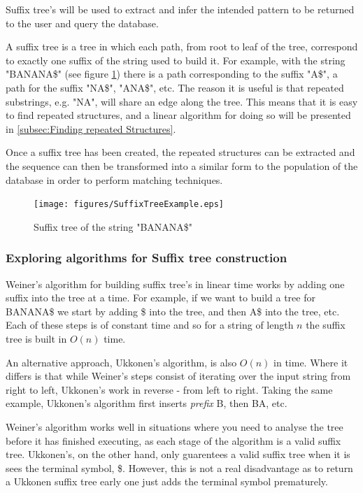 \documentclass[12pt,twoside,notitlepage]{report}
\begin{document}
		Suffix tree's will be used to extract and infer the intended pattern to be returned to the user and query the database.
		
		A suffix tree\cite{Weiner1973} is a tree in which each path, from root to leaf of the tree, correspond to exactly one suffix of the string used to build it. For example, with the string "BANANA\$" (see figure \ref{SuffixTree}) there is a path corresponding to the suffix "A\$", a path for the suffix "NA\$", "ANA\$", etc. The reason it is useful is that repeated substrings, e.g. "NA", will share an edge along the tree. This means that it is easy to find repeated structures, and a linear algorithm\cite{Ukonnen1995} for doing so will be presented in \ref{subsec:Finding repeated Structures}.	
		
		Once a suffix tree has been created, the repeated structures can be extracted and the sequence can then be transformed into a similar form to the population of the database in order to perform matching techniques.
\begin{figure}[h]
			\centerline{\texttt{[image: figures/SuffixTreeExample.eps]}}
			\caption{\label{SuffixTree} Suffix tree of the string "BANANA\$"}
\end{figure}
		
			\subsubsection{Exploring algorithms for Suffix tree construction}
			Weiner's algorithm\cite{Weiner1973} for building suffix tree's in linear time works by adding one suffix into the tree at a time. For example, if we want to build a tree for BANANA\$ we start by adding \$ into the tree, and then A\$ into the tree, etc. Each of these steps is of constant time and so for a string of length $n$ the suffix tree is built in $O(n)$ time.
			
			An alternative approach, Ukkonen's algorithm\cite{Ukkonen1995}, is also $O(n)$ in time. Where it differs is that while Weiner's steps consist of iterating over the input string from right to left, Ukkonen's work in reverse - from left to right. Taking the same example, Ukkonen's algorithm first inserts \emph{prefix} B, then BA, etc.
			
			Weiner's algorithm works well in situations where you need to analyse the tree before it has finished executing, as each stage of the algorithm is a valid suffix tree. Ukkonen's, on the other hand, only guarentees a valid suffix tree when it is sees the terminal symbol, \$. However, this is not a real disadvantage as to return a Ukkonen suffix tree early one just adds the terminal symbol prematurely.
			
\end{document}
